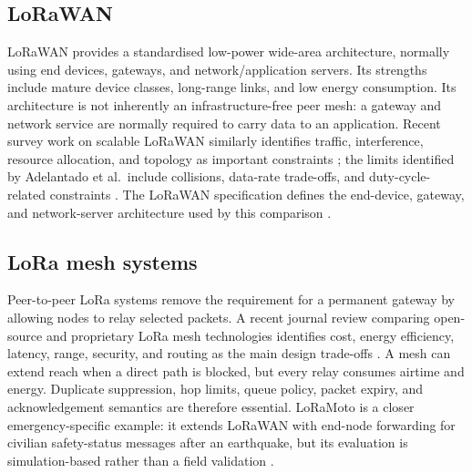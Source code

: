 \documentclass[journal]{IEEEtran}
\begin{document}
\subsection{LoRaWAN}
LoRaWAN provides a standardised low-power wide-area architecture, normally
using end devices, gateways, and network/application servers. Its strengths
include mature device classes, long-range links, and low energy consumption.
Its architecture is not inherently an infrastructure-free peer mesh: a
gateway and network service are normally required to carry data to an
application. Recent survey work on scalable LoRaWAN similarly identifies traffic,
interference, resource allocation, and topology as important constraints
\cite{jouhari2023}; the limits identified by Adelantado et al.\ include
collisions, data-rate trade-offs, and duty-cycle-related constraints
\cite{adelantado2017}.
The LoRaWAN specification defines the end-device, gateway, and network-server
architecture used by this comparison \cite{lorawan2020}.

\subsection{LoRa mesh systems}
Peer-to-peer LoRa systems remove the requirement for a permanent gateway by
allowing nodes to relay selected packets. A recent journal review comparing
open-source and proprietary LoRa mesh technologies identifies cost, energy
efficiency, latency, range, security, and routing as the main design
trade-offs \cite{hammouti2024}. A mesh can extend reach when a direct path is
blocked, but every relay consumes airtime and energy. Duplicate suppression,
hop limits, queue policy, packet expiry, and acknowledgement semantics are
therefore essential.
LoRaMoto is a closer emergency-specific example: it extends LoRaWAN with
end-node forwarding for civilian safety-status messages after an earthquake,
but its evaluation is simulation-based rather than a field validation
\cite{loramoto2021}.
\end{document}
